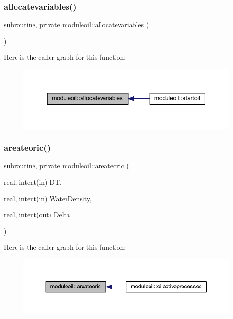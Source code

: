 \subsubsection{\texorpdfstring{allocatevariables()}{allocatevariables()}}
{\footnotesize\ttfamily subroutine, private moduleoil\+::allocatevariables (\begin{DoxyParamCaption}{ }\end{DoxyParamCaption})\hspace{0.3cm}{\ttfamily [private]}}

Here is the caller graph for this function\+:\nopagebreak
\begin{figure}[H]
\begin{center}
\leavevmode
\includegraphics[width=344pt]{namespacemoduleoil_af70b4b1248473e837294505db4f7ec5b_icgraph}
\end{center}
\end{figure}
\mbox{\label{namespacemoduleoil_aeef3927895fe2023671f25edeb829a30}} 
\subsubsection{\texorpdfstring{areateoric()}{areateoric()}}
{\footnotesize\ttfamily subroutine, private moduleoil\+::areateoric (\begin{DoxyParamCaption}\item[{real, intent(in)}]{DT,  }\item[{real, intent(in)}]{Water\+Density,  }\item[{real, intent(out)}]{Delta }\end{DoxyParamCaption})\hspace{0.3cm}{\ttfamily [private]}}

Here is the caller graph for this function\+:\nopagebreak
\begin{figure}[H]
\begin{center}
\leavevmode
\includegraphics[width=350pt]{namespacemoduleoil_aeef3927895fe2023671f25edeb829a30_icgraph}
\end{center}
\end{figure}
\mbox{\label{namespacemoduleoil_a0787ef4a57eb2967c2704c9a3fe30dbf}} 
